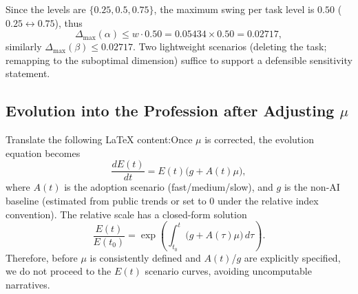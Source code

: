 Since the levels are $\{0.25,0.5,0.75\}$, the maximum swing per task level is $0.50$ ($0.25\leftrightarrow0.75$), thus
\begin{equation}
    \Delta_{\max}(\alpha)\le w\cdot 0.50 = 0.05434\times 0.50 = 0.02717,
\end{equation}
similarly $\Delta_{\max}(\beta)\le 0.02717$.
Two lightweight scenarios (deleting the task; remapping to the suboptimal dimension) suffice to support a defensible sensitivity statement.\subsection{Evolution into the Profession after Adjusting $\mu$}Translate the following LaTeX content:Once $\mu$ is corrected, the evolution equation becomes
\begin{equation}
    \frac{dE(t)}{dt}=E(t)\big(g + A(t)\mu\big),
\end{equation}
where $A(t)$ is the adoption scenario (fast/medium/slow), and $g$ is the non-AI baseline (estimated from public trends or set to $0$ under the relative index convention).
The relative scale has a closed-form solution
\begin{equation}
    \frac{E(t)}{E(t_0)}=\exp\left(\int_{t_0}^{t}\big(g+A(\tau)\mu\big)\,d\tau\right).
\end{equation}
Therefore, before $\mu$ is consistently defined and $A(t)$/$g$ are explicitly specified, we do not proceed to the $E(t)$ scenario curves, avoiding uncomputable narratives.
